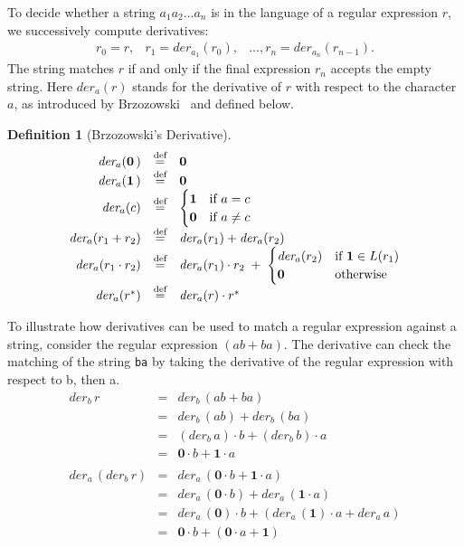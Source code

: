 \documentclass[12pt]{article}
\newtheorem{definition}{Definition} %
\newcommand{\dn}{\ensuremath{\stackrel{\mbox{\scriptsize def}}{=}}}
\newcommand{\ZERO}{\textbf{0}}
\newcommand{\ONE}{\textbf{1}}
\newcommand{\der}{\textit{der}}
\begin{document}
To decide whether a string $a_1 a_2 \dots a_n$ is in the language of a regular expression $r$, we successively 
compute derivatives:
\[
\begin{array}{rcl}
r_0 = r,& r_1 = \der_{a_1}(r_0),& \dots, r_n = \der_{a_n}(r_{n-1}) .
\end{array}
\]
The string matches $r$ if and only if the final expression $r_n$ accepts the empty string. Here $\der_a(r)$ stands for the derivative of $r$ with respect to the character
$a$, as introduced by Brzozowski~\cite{Brzozowski1964} and defined below.


\begin{definition}[Brzozowski’s Derivative]
\[
\begin{array}{rcl}
\der_a(\ZERO\,) &\dn& \ZERO \\
\der_a(\ONE\,) &\dn& \ZERO \\
\der_a(c) &\dn&
  \begin{cases}
    \ONE & \text{if } a = c \\
    \ZERO & \text{if } a \neq c
  \end{cases} \\[6pt]
\der_a(r_1 + r_2) &\dn& \der_a(r_1) + \der_a(r_2) \\
\der_a(r_1 \cdot r_2) &\dn& \der_a(r_1) \cdot r_2 \;+\;
   \begin{cases}
     \der_a(r_2) & \text{if } \ONE \in L(r_1)  \\
     \ZERO & \text{otherwise}
   \end{cases} \\
\der_a(r^\ast) &\dn& \der_a(r) \cdot r^\ast
\end{array}
\]

\end{definition}


To illustrate how derivatives can be used to match a regular expression against a string, consider the regular expression $( ab + ba )$. 
The derivative can check the matching of the string \texttt{ba} by taking the derivative of the regular expression with respect to b,
then a.
\[
\begin{array}{rcl}
\der_b\, r           & =           &  \der_b\, (ab + ba) \\
                     & =           & \der_b\, (ab) + \der_b\, (ba) \\
                     & =           & (\der_b\, a) \cdot b + (\der_b\, b) \cdot a  \\
                     & =           & \ZERO \cdot b + \ONE \cdot a \\\\

\der_a\, (\der_b\, r) & =           & \der_a\, (\ZERO \cdot b + \ONE \cdot a)\\
                      & =           & \der_a\, (\ZERO \cdot b) + \der_a\, (\ONE \cdot a)\\
                      & =           & \der_a\, (\ZERO) \cdot b + (\der_a\, (\ONE) \cdot a + \der_a\, a)\\
                      & =           & \ZERO \cdot b + (\ZERO \cdot a + \ONE )
\end{array}
\]
\end{document}
